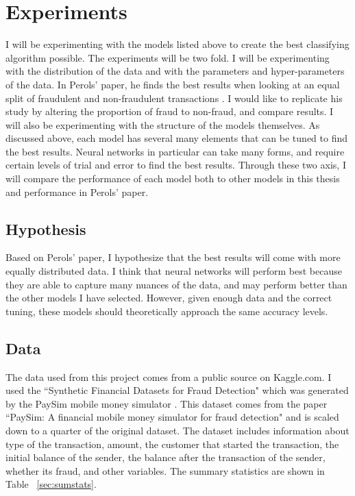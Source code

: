 \documentclass[midd]{thesis}
\begin{document}
\section{Experiments}

I will be experimenting with the models listed above to create the best classifying algorithm possible. The experiments will be two fold. I will be experimenting with the distribution of the data and with the parameters and hyper-parameters of the data. In Perols' paper, he finds the best results when looking at an equal split of fraudulent and non-fraudulent transactions \cite{Perols2011}. I would like to replicate his study by altering the proportion of fraud to non-fraud, and compare results. I will also be experimenting with the structure of the models themselves. As discussed above, each model has several many elements that can be tuned to find the best results. Neural networks in particular can take many forms, and require certain levels of trial and error to find the best results. Through these two axis, I will compare the performance of each model both to other models in this thesis and performance in Perols' paper. 


\subsection{Hypothesis}

Based on Perols' paper, I hypothesize that the best results will come with more equally distributed data. I think that neural networks will perform best because they are able to capture many nuances of the data, and may perform better than the other models I have selected. However, given enough data and the correct tuning, these models should theoretically approach the same accuracy levels. 

\subsection{Data}

The data used from this project comes from a public source on Kaggle.com. I used the ``Synthetic Financial Datasets for Fraud Detection" which was generated by the PaySim mobile money simulator \cite{paysim}. This dataset comes from the paper ``PaySim: A financial mobile money simulator for fraud detection" and is scaled down to a quarter of the original dataset. The dataset includes information about type of the transaction, amount, the customer that started the transaction, the initial balance of the sender, the balance after the transaction of the sender, whether its fraud, and other variables. The summary statistics are shown in Table ~\ref{sec:sumstats}. 
\end{document}
